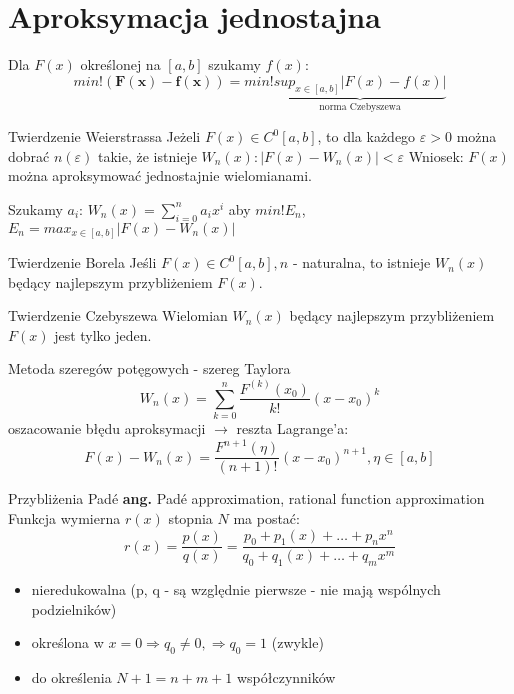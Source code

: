 \section{Aproksymacja jednostajna}
\begin{frame}
	Dla $F(x)$ określonej na $[a,b]$ szukamy $f(x)$:
    $$min! (\mathbf{F(x)-f(x)}) = min!\underbrace{sup_{x \in [a,b]}|F(x)-f(x)|}_{\text{norma Czebyszewa}}$$
\end{frame}
\begin{frame}
	\begin{block}{Twierdzenie Weierstrassa}
	Jeżeli $F(x) \in C^0[a,b]$, to dla każdego $\varepsilon>0$ można dobrać $n(\varepsilon)$ takie, że istnieje $W_n(x): |F(x)-W_n(x)|<\varepsilon$ \newline
    \newline Wniosek: $F(x)$ można aproksymować jednostajnie wielomianami.
	\end{block}
    Szukamy $a_i$:\newline
    $W_n(x) = \sum_{i=0}^{n}a_ix^i$ aby $min!E_n$, \newline
    $E_n = max_{x \in [a,b]} |F(x) - W_n(x)|$
\end{frame}
\begin{frame}
	\begin{block}{Twierdzenie Borela}
		Jeśli $F(x)\in C^0[a,b], n$ - naturalna, to istnieje $W_n(x)$ będący najlepszym przybliżeniem $F(x)$.
	\end{block}
    \begin{block}{Twierdzenie Czebyszewa}
    	Wielomian $W_n(x)$ będący najlepszym przybliżeniem $F(x)$ jest tylko jeden.
    \end{block}
\end{frame}
\begin{frame}{Metoda szeregów potęgowych - szereg Taylora}
	$$W_n(x) = \sum_{k=0}^{n}\frac{F^{(k)}(x_0)}{k!}(x-x_0)^k$$
    oszacowanie błędu aproksymacji $\rightarrow$ reszta Lagrange'a:
    $$F(x)-W_n(x) = \frac{F^{n+1}(\eta)}{(n+1)!}(x-x_0)^{n+1},\eta \in [a,b]$$
\end{frame}
\begin{frame}{Przybliżenia Padé}
	\textbf{ang.} Padé approximation, rational function approximation \newline
    \newline
    Funkcja wymierna $r(x)$ stopnia $N$ ma postać:
    $$r(x) = \frac{p(x)}{q(x)} = \frac{p_0+p_1(x)+\ldots+p_nx^n}{q_0+q_1(x)+\ldots+q_mx^m}$$
    \begin{itemize}
    \item nieredukowalna (p, q - są względnie pierwsze - nie mają wspólnych podzielników)
    \item określona w $x=0\Rightarrow q_0 \not = 0, \Rightarrow q_0=1$ (zwykle)
    \item do określenia $N+1 = n+m+1$ współczynników
    \end{itemize}
\end{frame}
